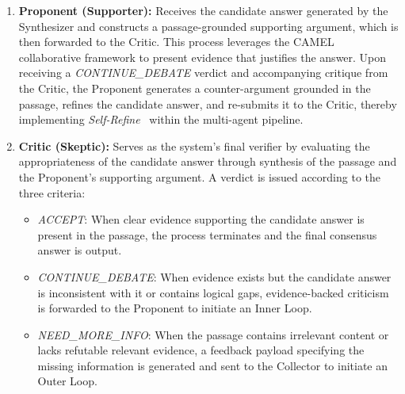 \begin{enumerate}
\item \textbf{Proponent (Supporter):}
  Receives the candidate answer generated by the Synthesizer and constructs a passage-grounded supporting argument, which is then forwarded to the Critic.
  This process leverages the CAMEL~\cite{li2023camel} collaborative framework to present evidence that justifies the answer.
  Upon receiving a \textit{CONTINUE\_DEBATE} verdict and accompanying critique from the Critic, the Proponent generates a counter-argument grounded in the passage, refines the candidate answer, and re-submits it to the Critic, thereby implementing \textit{Self-Refine}~\cite{madaan2023selfrefine} within the multi-agent pipeline.



\item \textbf{Critic (Skeptic):}
  Serves as the system’s final verifier by evaluating the appropriateness of the candidate answer through synthesis of the passage and the Proponent’s supporting argument.
  A verdict is issued according to the three criteria:
  \begin{itemize}
    \item \textit{ACCEPT}: When clear evidence supporting the candidate answer is present in the passage, the process terminates and the final consensus answer is output.
    \item \textit{CONTINUE\_DEBATE}: When evidence exists but the candidate answer is inconsistent with it or contains logical gaps, evidence-backed criticism is forwarded to the Proponent to initiate an Inner Loop.
    \item \textit{NEED\_MORE\_INFO}: When the passage contains irrelevant content or lacks refutable relevant evidence, a feedback payload specifying the missing information is generated and sent to the Collector to initiate an Outer Loop.
  \end{itemize}


\end{enumerate}
